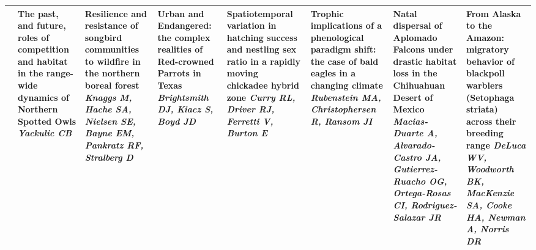 \begin{tabular}{|x{0.85cm}|x{2.85cm}|x{2.85cm}|x{2.85cm}|x{2.85cm}|x{2.85cm}|a{2.85cm}|x{2.85cm}|}
&The past, and future, roles of competition and habitat in the range-wide dynamics of Northern Spotted Owls \newline \newline \textit{Yackulic CB} & Resilience and resistance of songbird communities to wildfire in the northern boreal forest \newline \newline \textit{Knaggs M, Hache SA, Nielsen SE, Bayne EM, Pankratz RF, Stralberg D} & Urban and Endangered: the complex realities of Red-crowned Parrots in Texas \newline \newline \textit{Brightsmith DJ, Kiacz S, Boyd JD} & Spatiotemporal variation in hatching success and nestling sex ratio in a rapidly moving chickadee hybrid zone \newline \newline \textit{Curry RL, Driver RJ, Ferretti V, Burton E} & Trophic implications of a phenological paradigm shift: the case of bald eagles in a changing climate  \newline \newline \textit{Rubenstein MA, Christophersen R, Ransom JI} & Natal dispersal of Aplomado Falcons under drastic habitat loss in the Chihuahuan Desert of Mexico \newline \newline \textit{Macias-Duarte A, Alvarado-Castro JA, Gutierrez-Ruacho OG, Ortega-Rosas CI, Rodriguez-Salazar JR} & From Alaska to the Amazon: migratory behavior of blackpoll warblers (Setophaga striata) across their breeding range \newline \newline \textit{DeLuca WV, Woodworth BK, MacKenzie SA, Cooke HA, Newman A, Norris DR}\\
\hline

\end{tabular}
